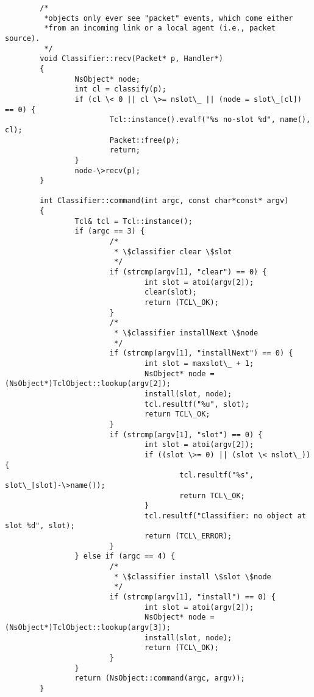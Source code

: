 \begin{verbatim}
        /*
         *objects only ever see "packet" events, which come either
         *from an incoming link or a local agent (i.e., packet source).
         */
        void Classifier::recv(Packet* p, Handler*)
        {
                NsObject* node;
                int cl = classify(p);
                if (cl \< 0 || cl \>= nslot\_ || (node = slot\_[cl]) == 0) {
                        Tcl::instance().evalf("%s no-slot %d", name(), cl);
                        Packet::free(p);
                        return;
                }
                node-\>recv(p);
        }

        int Classifier::command(int argc, const char*const* argv)
        {
                Tcl& tcl = Tcl::instance();
                if (argc == 3) {
                        /*
                         * \$classifier clear \$slot
                         */
                        if (strcmp(argv[1], "clear") == 0) {
                                int slot = atoi(argv[2]);
                                clear(slot);
                                return (TCL\_OK);
                        }
                        /*
                         * \$classifier installNext \$node
                         */
                        if (strcmp(argv[1], "installNext") == 0) {
                                int slot = maxslot\_ + 1;
                                NsObject* node = (NsObject*)TclObject::lookup(argv[2]);
                                install(slot, node);
                                tcl.resultf("%u", slot);
                                return TCL\_OK;
                        }
                        if (strcmp(argv[1], "slot") == 0) {
                                int slot = atoi(argv[2]);
                                if ((slot \>= 0) || (slot \< nslot\_)) {
                                        tcl.resultf("%s", slot\_[slot]-\>name());
                                        return TCL\_OK;
                                }
                                tcl.resultf("Classifier: no object at slot %d", slot);
                                return (TCL\_ERROR);
                        }
                } else if (argc == 4) {
                        /*
                         * \$classifier install \$slot \$node
                         */
                        if (strcmp(argv[1], "install") == 0) {
                                int slot = atoi(argv[2]);
                                NsObject* node = (NsObject*)TclObject::lookup(argv[3]);
                                install(slot, node);
                                return (TCL\_OK);
                        }
                }
                return (NsObject::command(argc, argv));
        }
\end{verbatim} %
